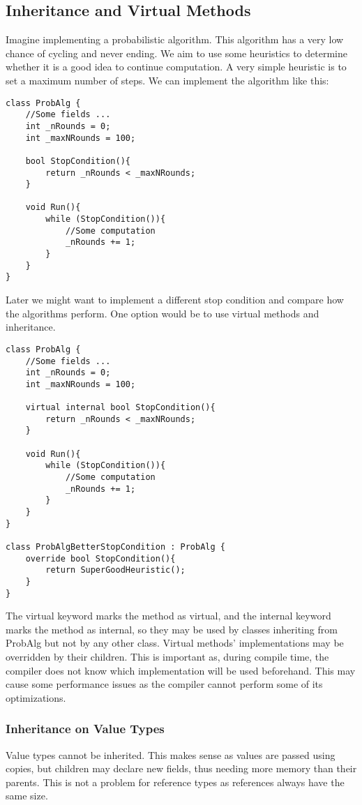 \subsection{Inheritance and Virtual Methods}
Imagine implementing a probabilistic algorithm. This algorithm has a very low chance of cycling and never ending. We aim to use some heuristics to determine whether it is a good idea to continue computation. A very simple heuristic is to set a maximum number of steps. We can implement the algorithm like this:

\begin{lstlisting}
class ProbAlg {
    //Some fields ...
    int _nRounds = 0;
    int _maxNRounds = 100;

    bool StopCondition(){
        return _nRounds < _maxNRounds;
    }

    void Run(){
        while (StopCondition()){
            //Some computation 
            _nRounds += 1;
        }
    }
}
\end{lstlisting}

Later we might want to implement a different stop condition and compare how the algorithms perform. One option would be to use virtual methods and inheritance.

\begin{lstlisting}
class ProbAlg {
    //Some fields ...
    int _nRounds = 0;
    int _maxNRounds = 100;

    virtual internal bool StopCondition(){
        return _nRounds < _maxNRounds;
    }

    void Run(){
        while (StopCondition()){
            //Some computation 
            _nRounds += 1;
        }
    }
}

class ProbAlgBetterStopCondition : ProbAlg {
    override bool StopCondition(){
        return SuperGoodHeuristic();
    }
}
\end{lstlisting}

The virtual keyword marks the method as virtual, and the internal keyword marks the method as internal, so they may be used by classes inheriting from ProbAlg but not by any other class. Virtual methods' implementations may be overridden by their children. This is important as, during compile time, the compiler does not know which implementation will be used beforehand. This may cause some performance issues as the compiler cannot perform some of its optimizations.


\subsubsection{Inheritance on Value Types}
Value types cannot be inherited. This makes sense as values are passed using copies, but children may declare new fields, thus needing more memory than their parents. This is not a problem for reference types as references always have the same size.

